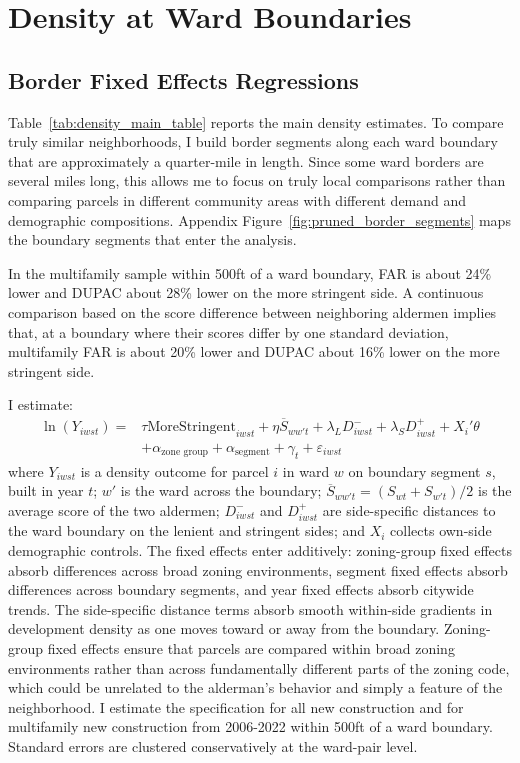 \section{Density at Ward Boundaries}
\label{sec:empirical_results_density}

\subsection{Border Fixed Effects Regressions}

Table~\ref{tab:density_main_table} reports the main density estimates.
To compare truly similar neighborhoods, I build border segments along each ward boundary that are approximately a quarter-mile in length. 
Since some ward borders are several miles long, this allows me to focus on truly local comparisons rather than comparing parcels in different community areas with different demand and demographic compositions.
Appendix Figure~\ref{fig:pruned_border_segments} maps the boundary segments that enter the analysis.

In the multifamily sample within 500ft of a ward boundary, FAR is about 24\% lower and DUPAC about 28\% lower on the more stringent side.
A continuous comparison based on the score difference between neighboring aldermen implies that, at a boundary where their scores differ by one standard deviation, multifamily FAR is about 20\% lower and DUPAC about 16\% lower on the more stringent side.

I estimate:
%
\begin{equation} \label{eq:segment_fe}
\begin{aligned}
    \ln(Y_{iwst}) ={}& \tau \text{MoreStringent}_{iwst} + \eta \overline{S}_{ww't}
    + \lambda_L D^-_{iwst} + \lambda_S D^+_{iwst} + X_i'\theta \\
    &+ \alpha_{\text{zone group}} + \alpha_{\text{segment}} + \gamma_t + \varepsilon_{iwst}
\end{aligned}
\end{equation}
%
where $Y_{iwst}$ is a density outcome for parcel $i$ in ward $w$ on boundary segment $s$, built in year $t$; $w'$ is the ward across the boundary; $\overline{S}_{ww't}=(S_{wt}+S_{w't})/2$ is the average score of the two aldermen; $D^-_{iwst}$ and $D^+_{iwst}$ are side-specific distances to the ward boundary on the lenient and stringent sides; and $X_i$ collects own-side demographic controls.
The fixed effects enter additively: zoning-group fixed effects absorb differences across broad zoning environments, segment fixed effects absorb differences across boundary segments, and year fixed effects absorb citywide trends.
The side-specific distance terms absorb smooth within-side gradients in development density as one moves toward or away from the boundary.
Zoning-group fixed effects ensure that parcels are compared within broad zoning environments rather than across fundamentally different parts of the zoning code, which could be 
unrelated to the alderman's behavior and simply a feature of the neighborhood.
I estimate the specification for all new construction and for multifamily new construction from 2006-2022 within 500ft of a ward boundary.
Standard errors are clustered conservatively at the ward-pair level.

